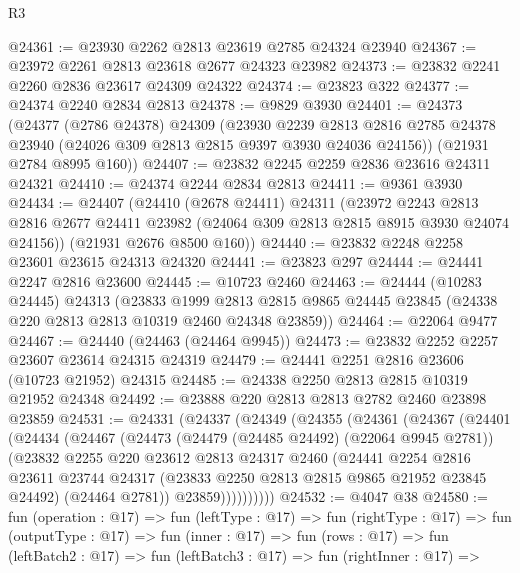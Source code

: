 \begin{lexlean}{R3}
\begin{coremodule}
@24361 := @23930 @2262 @2813 @23619 @2785 @24324 @23940
@24367 := @23972 @2261 @2813 @23618 @2677 @24323 @23982
@24373 := @23832 @2241 @2260 @2836 @23617 @24309 @24322
@24374 := @23823 @322
@24377 := @24374 @2240 @2834 @2813
@24378 := @9829 @3930
@24401 := @24373
    (@24377
      (@2786 @24378)
      @24309
      (@23930
        @2239
        @2813
        @2816
        @2785
        @24378
        @23940
        (@24026 @309 @2813 @2815 @9397 @3930 @24036 @24156))
      (@21931 @2784 @8995 @160))
@24407 := @23832 @2245 @2259 @2836 @23616 @24311 @24321
@24410 := @24374 @2244 @2834 @2813
@24411 := @9361 @3930
@24434 := @24407
    (@24410
      (@2678 @24411)
      @24311
      (@23972
        @2243
        @2813
        @2816
        @2677
        @24411
        @23982
        (@24064 @309 @2813 @2815 @8915 @3930 @24074 @24156))
      (@21931 @2676 @8500 @160))
@24440 := @23832 @2248 @2258 @23601 @23615 @24313 @24320
@24441 := @23823 @297
@24444 := @24441 @2247 @2816 @23600
@24445 := @10723 @2460
@24463 := @24444
    (@10283 @24445)
    @24313
    (@23833
      @1999
      @2813
      @2815
      @9865
      @24445
      @23845
      (@24338 @220 @2813 @2813 @10319 @2460 @24348 @23859))
@24464 := @22064 @9477
@24467 := @24440 (@24463 (@24464 @9945))
@24473 := @23832 @2252 @2257 @23607 @23614 @24315 @24319
@24479 := @24441 @2251 @2816 @23606 (@10723 @21952) @24315
@24485 := @24338 @2250 @2813 @2815 @10319 @21952 @24348
@24492 := @23888 @220 @2813 @2813 @2782 @2460 @23898 @23859
@24531 := @24331
    (@24337
      (@24349
        (@24355
          (@24361
            (@24367
              (@24401
                (@24434
                  (@24467
                    (@24473
                      (@24479 (@24485 @24492) (@22064 @9945 @2781))
                      (@23832
                        @2255
                        @220
                        @23612
                        @2813
                        @24317
                        @2460
                        (@24441
                          @2254
                          @2816
                          @23611
                          @23744
                          @24317
                          (@23833 @2250 @2813 @2815 @9865 @21952 @23845 @24492)
                          (@24464 @2781))
                        @23859))))))))))
@24532 := @4047 @38
@24580 := fun (operation : @17) =>
  fun (leftType : @17) =>
  fun (rightType : @17) =>
  fun (outputType : @17) =>
  fun (inner : @17) =>
  fun (rows : @17) =>
  fun (leftBatch2 : @17) =>
  fun (leftBatch3 : @17) =>
  fun (rightInner : @17) =>

\end{coremodule}
\end{lexlean}
